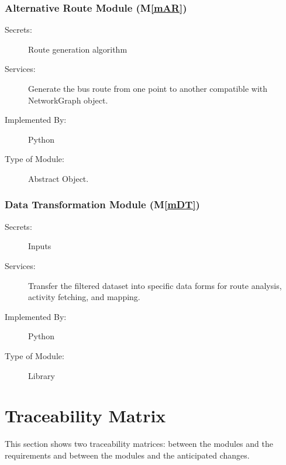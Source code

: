 \documentclass[12pt, titlepage]{article}
\newcommand{\mref}[1]{M\ref{#1}}
\begin{document}
\subsubsection{Alternative Route Module (\mref{mAR})}
\begin{description}
\item[Secrets:]Route generation algorithm
\item[Services:]Generate the bus route from one point to another compatible with NetworkGraph object.
\item[Implemented By:] Python
\item[Type of Module:] Abstract Object.
\end{description}

\subsubsection{Data Transformation Module (\mref{mDT})}
\begin{description}
\item[Secrets:]Inputs
\item[Services:]Transfer the filtered dataset into specific data forms for route analysis, activity fetching, and mapping. 
\item[Implemented By:] Python
\item[Type of Module:] Library
\end{description}

\section{Traceability Matrix} \label{SecTM}

This section shows two traceability matrices: between the modules and the
requirements and between the modules and the anticipated changes.
\end{document}
